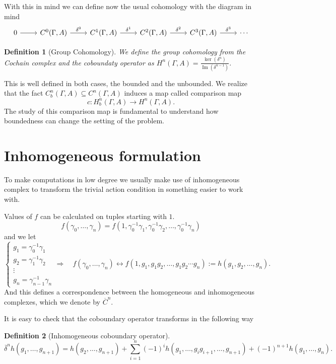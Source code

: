 \documentclass[leqno]{article}
\DeclareMathOperator{\im}{Im}
\newtheorem*{definition}{Definition}
\begin{document}
With this in mind we can define now the usual cohomology with the diagram in mind
\[\begin{tikzcd}
	0 & {C^0(\Gamma, A)} & {C^1(\Gamma, A)} & {C^2(\Gamma, A)} & {C^3(\Gamma, A)} & \cdots
	\arrow[from=1-1, to=1-2]
	\arrow["{\delta^0}", from=1-2, to=1-3]
	\arrow["{\delta^1}", from=1-3, to=1-4]
	\arrow["{\delta^2}", from=1-4, to=1-5]
	\arrow["{\delta^3}", from=1-5, to=1-6]
\end{tikzcd}\]

\begin{definition}[Group Cohomology] We define the group cohomology from the Cochain complex and the coboundaty operator as $\displaystyle H^n(\Gamma , A) = \frac{\ker(\delta^n)}{\im(\delta^{n-1})}$.
\end{definition}

This is well defined in both cases, the bounded and the unbounded. We realize that the fact $C_b^n(\Gamma , A)\subseteq C^n(\Gamma , A)$ induces a map called comparison map
\[
c: H_b^n(\Gamma , A) \to  H^n(\Gamma , A).
\] 
The study of this comparison map is fundamental to understand how boundedness can change the setting of the problem.

\section{Inhomogeneous formulation}
To make computations in low degree we usually make use of inhomogeneous complex to transform the trivial action condition in something easier to work with.

Values of $f$ can be calculated on tuples starting with $1$.
 \[
f(\gamma_0, \ldots, \gamma_n) = f(1, \gamma_0^{-1}\gamma_1, \gamma_0^{-1}\gamma_2, \ldots, \gamma_0^{-1} \gamma_n)
\] 
and we let
\[
\begin{cases}
 g_1 = \gamma_0^{-1}\gamma_1\\
 g_2 = \gamma_1^{-1}\gamma_2\\
 \vdots\\
 g_n = \gamma_{n-1}^{-1} \gamma_n
\end{cases}
\Rightarrow \quad
f(\gamma_0, \ldots, \gamma_n) 
\leftrightarrow f(1, g_1, g_1g_2, \ldots, g_1g_2\cdots g_n) := h(g_1, g_2, \ldots, g_n).
\] 
And this defines a correspondence between the homogeneous and inhomogeneous complexes, which we denote by $\overline{C}^n$.

It is easy to check that the coboundary operator transforms in the following way 
\begin{definition}[Inhomogeneous coboundary operator]
  \[
	\overline{\delta}^nh(g_1, \ldots, g_{n+1}) = h(g_2, \ldots, g_{n+1}) + \sum_{i=1}^n (-1)^ih(g_1, \ldots, g_ig_{i+1}, \ldots, g_{n+1}) + (-1)^{n+1}h(g_1, \ldots, g_n).
  \] 
\end{definition}
\end{document}
